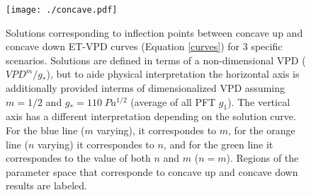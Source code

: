 \documentclass[draft,linenumbers]{agujournal}
\begin{document}
\begin{figure}
  \centering
  \centerline{\texttt{[image: ./concave.pdf]}}
  \caption{ Solutions corresponding to inflection points between
    concave up and concave down ET-VPD curves (Equation \ref{curves})
    for 3 specific scenarios. Solutions are defined in terms of a
    non-dimensional VPD ($VPD^m/g_*$), but to aide physical
    interpretation the horizontal axis is additionally provided interms of dimensionalized VPD assuming $m=1/2$ and
    $g_*=110\; Pa^{1/2}$ (average of all PFT $g_1$). The vertical axis
    has a different interpretation depending on the solution
    curve. For the blue line ($m$ varying), it correspondes to $m$,
    for the orange line ($n$ varying) it correspondes to $n$, and for
    the green line it correspondes to the value of both $n$ and $m$
    ($n=m$). Regions of the parameter space that corresponde to
    concave up and concave down results are labeled.}
  \label{concave}
\end{figure}
\end{document}
